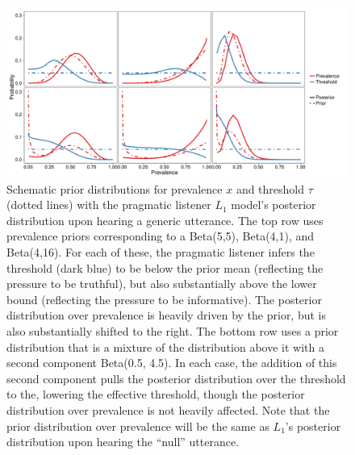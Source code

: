 \documentclass[12pt,letterpaper]{article}
\begin{document}
\begin{figure}
\centering
    \includegraphics[width=\columnwidth]{schematics.pdf}
    \caption{Schematic prior distributions for prevalence $x$ and threshold $\tau$ (dotted lines) with the pragmatic listener $L_1$ model's posterior distribution upon hearing a generic utterance.  
    The top row uses prevalence priors corresponding to a Beta(5,5), Beta(4,1), and Beta(4,16).
    For each of these, the pragmatic listener infers the threshold (dark blue) to be below the prior mean (reflecting the pressure to be truthful), but also substantially above the lower bound (reflecting the pressure to be informative).
    The posterior distribution over prevalence is heavily driven by the prior, but is also substantially shifted to the right. 
    The bottom row uses a prior distribution that is a mixture of the distribution above it with a second component Beta(0.5, 4.5).
    In each case, the addition of this second component pulls the posterior distribution over the threshold to the, lowering the effective threshold, though the posterior distribution over prevalence is not heavily affected.
    Note that the prior distribution over prevalence will be the same as $L_1$'s posterior distribution upon hearing the ``null'' utterance.
    }
  \label{fig:schematic-unif}
\end{figure}
\end{document}
